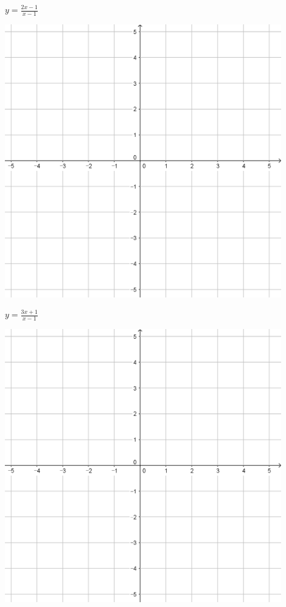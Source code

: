 \documentclass[a4paper]{oblivoir}
\begin{document}
\begin{minipage}{0.45\textwidth}\centering
\(y=\frac{2x-1}{x-1}\)
\par\bigskip\includegraphics[width=0.9\textwidth]{55}
\end{minipage}
\begin{minipage}{0.45\textwidth}\centering
\(y=\frac{3x+1}{x-1}\)
\par\bigskip\includegraphics[width=0.9\textwidth]{55}
\end{minipage}\bigskip\bigskip\par
\end{document}
